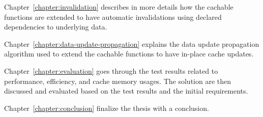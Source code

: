 Chapter~\ref{chapter:invalidation} describes in more details how the cachable functions are extended to have automatic invalidations using declared dependencies to underlying data.

Chapter~\ref{chapter:data-update-propagation} explains the data update propagation algorithm used to extend the cachable functions to have in-place cache updates.

Chapter~\ref{chapter:evaluation} goes through the test results related to performance, efficiency, and cache memory usages. The solution are then discussed and evaluated based on the test results and the initial requirements.

Chapter~\ref{chapter:conclusion} finalize the thesis with a conclusion.




